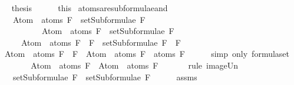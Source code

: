 \begin{isabellebody}
\ \isamarkupfalse%
\ {\isacharquery}thesis\isanewline
\ \ \ \ \isamarkupfalse%
\ this\isanewline
{}\isamarkupfalse%
%
\endisatagproof
{\isafoldproof}%
%
\isadelimproof
\isanewline
%
\endisadelimproof
\isanewline
{}\isamarkupfalse%
\ atoms{\isacharunderscore}are{\isacharunderscore}subformulae{\isacharunderscore}and{\isacharcolon}\ \isanewline
\ \ \ {\isachardoublequoteopen}Atom\ {\isacharbackquote}\ atoms\ F{}\ {\isasymsubseteq}\ setSubformulae\ F{}{\isachardoublequoteclose}\isanewline
\ \ \ \ \ \ \ \ \ \ {\isachardoublequoteopen}Atom\ {\isacharbackquote}\ atoms\ F{}\ {\isasymsubseteq}\ setSubformulae\ F{}{\isachardoublequoteclose}\isanewline
\ \ \ \ \ {\isachardoublequoteopen}Atom\ {\isacharbackquote}\ atoms\ {\isacharparenleft}F{}\ \isactrlbold {\isasymand}\ F{}{\isacharparenright}\ {\isasymsubseteq}\ setSubformulae\ {\isacharparenleft}F{}\ \isactrlbold {\isasymand}\ F{}{\isacharparenright}{\isachardoublequoteclose}\isanewline
%
\isadelimproof
%
\endisadelimproof
%
\isatagproof
{}\isamarkupfalse%
\ {\isacharminus}\isanewline
\ \ \isamarkupfalse%
\ {\isachardoublequoteopen}Atom\ {\isacharbackquote}\ atoms\ {\isacharparenleft}F{}\ \isactrlbold {\isasymand}\ F{}{\isacharparenright}\ {\isacharequal}\ Atom\ {\isacharbackquote}\ {\isacharparenleft}atoms\ F{}\ {\isasymunion}\ atoms\ F{}{\isacharparenright}{\isachardoublequoteclose}\isanewline
\ \ \ \ \isamarkupfalse%
\ {\isacharparenleft}simp\ only{\isacharcolon}\ formula{\isachardot}set{\isacharparenleft}{}{\isacharparenright}{\isacharparenright}\isanewline
\ \ \isamarkupfalse%
\ \isamarkupfalse%
\ {\isachardoublequoteopen}{\isasymdots}\ {\isacharequal}\ Atom\ {\isacharbackquote}\ atoms\ F{}\ {\isasymunion}\ Atom\ {\isacharbackquote}\ atoms\ F{}{\isachardoublequoteclose}\ \isanewline
\ \ \ \ \isamarkupfalse%
\ {\isacharparenleft}rule\ image{\isacharunderscore}Un{\isacharparenright}\isanewline
\ \ \isamarkupfalse%
\ \isamarkupfalse%
\ {\isachardoublequoteopen}{\isasymdots}\ {\isasymsubseteq}\ setSubformulae\ F{}\ {\isasymunion}\ setSubformulae\ F{}{\isachardoublequoteclose}\isanewline
\ \ \ \ \isamarkupfalse%
\ assms\isanewline
\ \ \ \ \isamarkupfalse%

\end{isabellebody}
